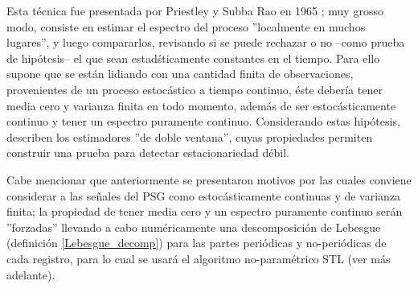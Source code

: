 Esta t\'ecnica fue presentada por Priestley y Subba Rao en 1965 \cite{Priestley69}; 
muy grosso modo, consiste en estimar el espectro
del proceso 
''localmente en muchos lugares'',
y luego compararlos, revisando si se puede rechazar o no --como prueba de hip\'otesis-- 
el que sean estad\'sticamente constantes en el tiempo.
%
Para ello 
supone que 
se est\'an lidiando con una cantidad finita de observaciones, provenientes de un
proceso estoc\'astico a tiempo continuo, \'este deber\'ia tener media cero y varianza 
finita en todo momento, adem\'as de ser estoc\'asticamente continuo y tener un espectro
puramente continuo.
Considerando estas hip\'otesis, describen los estimadores ''de doble ventana'', cuyas
propiedades permiten construir una prueba para detectar estacionariedad d\'ebil.

Cabe mencionar que anteriormente se presentaron
motivos por las cuales conviene considerar a las se\~nales del PSG como
estoc\'asticamente continuas y de varianza finita; la propiedad de tener media cero
y un espectro puramente continuo ser\'an ''forzadas'' llevando a cabo 
num\'ericamente
una descomposici\'on de
Lebesgue (definici\'on \ref{Lebesgue_decomp}) para las partes peri\'odicas y no-peri\'odicas
de cada registro, para lo cual se usar\'a el
algoritmo no-param\'etrico STL (ver m\'as adelante).




